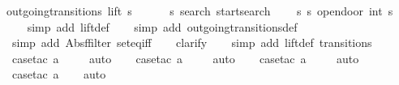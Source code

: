 \begin{isabellebody}
outgoing{\isacharunderscore}transitions\ lift\ s\ {\isacharequal}\ {\isacharbraceleft}{\isacharbar}\isanewline
\ \ \ \ {\isacharparenleft}{\isacharparenleft}s{\isacharcomma}\ search{\isacharparenright}{\isacharcomma}\ startsearch{\isacharparenright}{\isacharcomma}\isanewline
\ \ \ \ {\isacharparenleft}{\isacharparenleft}s{\isacharcomma}\ s{\isacharparenright}{\isacharcomma}\ opendoor\ {\isacharparenleft}int\ s\ {\isacharminus}\ {}{\isacharparenright}{\isacharparenright}\isanewline
{\isacharbar}{\isacharbraceright}{\isachardoublequoteclose}\isanewline
%
\isadelimproof
\isanewline
\ \ %
\endisadelimproof
%
\isatagproof
{}\isamarkupfalse%
\ {\isacharparenleft}simp\ add{\isacharcolon}\ lift{\isacharunderscore}def{\isacharparenright}\isanewline
\isanewline
\ \ \isamarkupfalse%
\ {\isacharparenleft}simp\ add{\isacharcolon}\ outgoing{\isacharunderscore}transitions{\isacharunderscore}def{\isacharparenright}\isanewline
\ \ \isamarkupfalse%
\ {\isacharparenleft}simp\ add{\isacharcolon}\ Abs{\isacharunderscore}ffilter\ set{\isacharunderscore}eq{\isacharunderscore}iff{\isacharparenright}\isanewline
\ \ \isamarkupfalse%
\ clarify\isanewline
\ \ \isamarkupfalse%
\ {\isacharparenleft}simp\ add{\isacharcolon}\ lift{\isacharunderscore}def\ transitions{\isacharparenright}\isanewline
\ \ \isamarkupfalse%
\ {\isacharparenleft}case{\isacharunderscore}tac\ {\isachardoublequoteopen}a{\isacharequal}{}{\isachardoublequoteclose}{\isacharparenright}\isanewline
\ \ \ \isamarkupfalse%
\ auto{\isacharbrackleft}{}{\isacharbrackright}\isanewline
\ \ \isamarkupfalse%
\ {\isacharparenleft}case{\isacharunderscore}tac\ {\isachardoublequoteopen}a{\isacharequal}{}{\isachardoublequoteclose}{\isacharparenright}\isanewline
\ \ \ \isamarkupfalse%
\ auto{\isacharbrackleft}{}{\isacharbrackright}\isanewline
\ \ \isamarkupfalse%
\ {\isacharparenleft}case{\isacharunderscore}tac\ {\isachardoublequoteopen}a{\isacharequal}{}{\isachardoublequoteclose}{\isacharparenright}\isanewline
\ \ \ \isamarkupfalse%
\ auto{\isacharbrackleft}{}{\isacharbrackright}\isanewline
\ \ \isamarkupfalse%
\ {\isacharparenleft}case{\isacharunderscore}tac\ {\isachardoublequoteopen}a{\isacharequal}{}{\isachardoublequoteclose}{\isacharparenright}\isanewline
\ \ \isamarkupfalse%
\ auto%
\endisatagproof
{\isafoldproof}%

\end{isabellebody}
